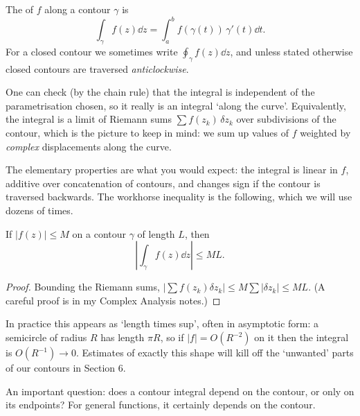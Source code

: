 \documentclass[a4paper]{scrartcl}
\begin{document}
\begin{definition}
	The  of $f$ along a contour $\gamma$ is
	$$
	\int_\gamma f(z) \dd z = \int_a^b f(\gamma(t)) \, \gamma'(t) \dd t.
	$$
	For a closed contour we sometimes write $\oint_\gamma f(z) \dd z$, and unless stated otherwise closed contours are traversed \emph{anticlockwise}.
\end{definition}

One can check (by the chain rule) that the integral is independent of the parametrisation chosen, so it really is an integral `along the curve'. Equivalently, the integral is a limit of Riemann sums $\sum f(z_k) \, \delta z_k$ over subdivisions of the contour, which is the picture to keep in mind: we sum up values of $f$ weighted by \emph{complex} displacements along the curve.

The elementary properties are what you would expect: the integral is linear in $f$, additive over concatenation of contours, and changes sign if the contour is traversed backwards. The workhorse inequality is the following, which we will use dozens of times.

\begin{lemma}
	If $|f(z)| \leq M$ on a contour $\gamma$ of length $L$, then
	$$
	\left| \int_\gamma f(z) \dd z \right| \leq ML.
	$$
\end{lemma}
\begin{proof}
	Bounding the Riemann sums, $|\sum f(z_k) \delta z_k| \leq M \sum |\delta z_k| \leq ML$. (A careful proof is in my Complex Analysis notes.)
\end{proof}

In practice this appears as `length times sup', often in asymptotic form: a semicircle of radius $R$ has length $\pi R$, so if $|f| = O(R^{-2})$ on it then the integral is $O(R^{-1}) \to 0$. Estimates of exactly this shape will kill off the `unwanted' parts of our contours in Section 6.

An important question: does a contour integral depend on the contour, or only on its endpoints? For general functions, it certainly depends on the contour.
\end{document}

